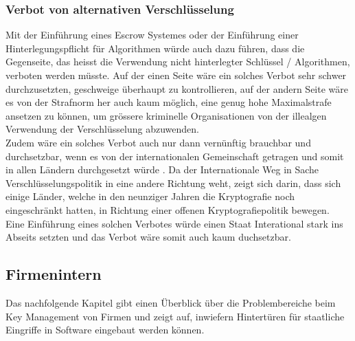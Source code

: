 	
	\subsubsection{Verbot von alternativen Verschlüsselung}
Mit der Einführung eines Escrow Systemes oder der Einführung einer Hinterlegungspflicht für Algorithmen würde auch dazu führen, dass die Gegenseite, das heisst die Verwendung nicht hinterlegter Schlüssel / Algorithmen, verboten werden müsste. Auf der einen Seite wäre ein solches Verbot sehr schwer durchzusetzten, geschweige überhaupt zu kontrollieren, auf der andern Seite wäre es von der Strafnorm her auch kaum möglich, eine genug hohe Maximalstrafe ansetzen zu können, um grössere kriminelle Organisationen von der illealgen Verwendung der Verschlüsselung abzuwenden. \cite{adminch} \\ %
Zudem wäre ein solches Verbot auch nur dann vernünftig brauchbar und durchsetzbar, wenn es von der internationalen Gemeinschaft getragen und somit in allen Ländern durchgesetzt würde \cite{denning}. Da der Internationale Weg in Sache Verschlüsselungspolitik in eine andere Richtung weht, zeigt sich darin, dass sich einige Länder, welche in den neunziger Jahren die Kryptografie noch eingeschränkt hatten, in Richtung einer offenen Kryptografiepolitik bewegen. \cite{epic} \cite{adminch} \\ %
Eine Einführung eines solchen Verbotes würde einen Staat Interational stark ins Abseits setzten und das Verbot wäre somit auch kaum duchsetzbar.
		
	\subsection{Firmenintern}
Das nachfolgende Kapitel gibt einen Überblick über die Problembereiche beim Key Management von Firmen und zeigt auf, inwiefern Hintertüren für staatliche Eingriffe in Software eingebaut werden können.

